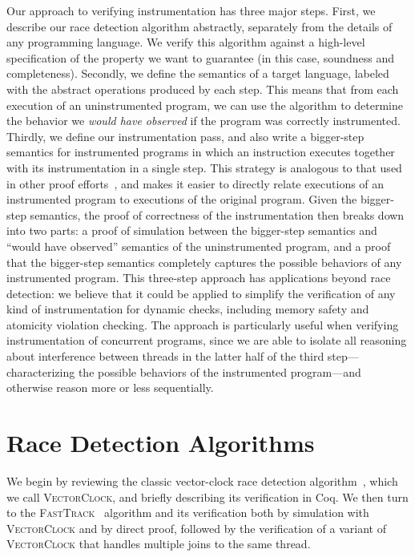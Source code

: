 \documentclass[preprint, 10pt]{sigplanconf}
\newcommand{\VCalg}{\textsc{VectorClock}\xspace}
\newcommand{\FT}{\textsc{FastTrack}\xspace}
\begin{document}
Our approach to verifying instrumentation has three major steps. First, we describe our race detection algorithm abstractly, separately from the details of any programming language. We verify this algorithm against a high-level specification of the property we want to guarantee (in this case, soundness and completeness). Secondly, we define the semantics of a target language, labeled with the abstract operations produced by each step. This means that from each execution of an uninstrumented program, we can use the algorithm to determine the behavior we \emph{would have observed} if the program was correctly instrumented. Thirdly, we define our instrumentation pass, and also write a bigger-step semantics for instrumented programs in which an instruction executes together with its instrumentation in a single step. This strategy is analogous to that used in other proof efforts~\cite{softbound}, and makes it easier to directly relate executions of an instrumented program to executions of the original program. Given the bigger-step semantics, the proof of correctness of the instrumentation then breaks down into two parts: a proof of simulation between the bigger-step semantics and ``would have observed'' semantics of the uninstrumented program, and a proof that the bigger-step semantics completely captures the possible behaviors of any instrumented program. This three-step approach has applications beyond race detection: we believe that it could be applied to simplify the verification of any kind of instrumentation for dynamic checks, including memory safety and atomicity violation checking. The approach is particularly useful when verifying instrumentation of concurrent programs, since we are able to isolate all reasoning about interference between threads in the latter half of the third step---characterizing the possible behaviors of the instrumented program---and otherwise reason more or less sequentially.

\section{Race Detection Algorithms}
\label{algorithms}
We begin by reviewing the classic vector-clock race detection algorithm~\cite{vcmattern, vcfidge}, which we call \VCalg, and briefly describing its verification in Coq. We then turn to the \FT~\cite{fasttrack} algorithm and its verification both by simulation with \VCalg and by direct proof, followed by the verification of a variant of \VCalg that handles multiple joins to the same thread.
\end{document}
